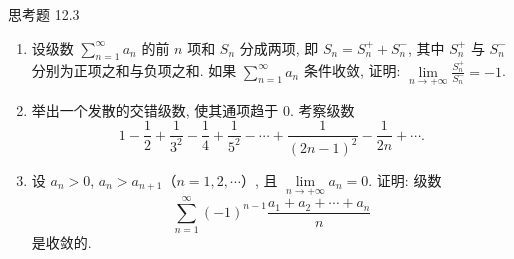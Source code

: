 \begin{exblock}{思考题 12.3}
\begin{enumerate}
\begin{enumerate}
\[\]
    \item $\displaystyle S(x)=\sum_{k=1}^{\infty}\frac{\sin kx}{k}
          =\left\{\begin{array}
{ll}
            0, & x=0,\\[
2pt]
            \dfrac{\pi-x}{2}, & 0<x\leqslant\pi.
\end{array}\right.$
          （对照例 \ref{ex:16.1.2}）.
  \end{enumerate}
  \item 设级数 $\sum_{n=1}^{\infty}a_{n}$ 的前 $n$ 项和 $S_{n}$ 分成两项, 即 $S_{n}=S_{n}^{+}+S_{n}^{-}$, 其中 $S_{n}^{+}$ 与 $S_{n}^{-}$ 分别为正项之和与负项之和. 如果 $\sum_{n=1}^{\infty}a_{n}$ 条件收敛, 证明: $\lim\limits_{n\to+\infty}\frac{S_{n}^{+}}{S_{n}^{-}}=-1$.
  \item 举出一个发散的交错级数, 使其通项趋于 $0$. 考察级数
  \[
    1-\frac{1}{2}+\frac{1}{3^{2}}-\frac{1}{4}+\frac{1}{5^{2}}-\cdots
    +\frac{1}{(2n-1)^{2}}-\frac{1}{2n}+\cdots.
\]
  \item 设 $a_{n}>0$, $a_{n}>a_{n+1}$（$n=1,2,\cdots$）, 且 $\lim\limits_{n\to+\infty}a_{n}=0$. 证明: 级数
  \[
    \sum_{n=1}^{\infty}(-1)^{n-1}\frac{a_{1}+a_{2}+\cdots+a_{n}}{n}
\]
  是收敛的.
\end{enumerate}
\end{exblock}
